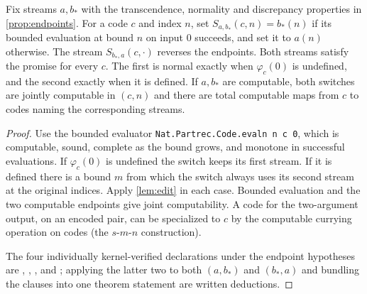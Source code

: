 \documentclass[11pt]{article}
\begin{document}
\begin{theorem}\label{thm:switch}
Fix streams \(a,b_*\) with the transcendence, normality and discrepancy properties in \cref{prop:endpoints}. For a code \(c\) and index \(n\), set \(S_{a,b_*}(c,n)=b_*(n)\) if its bounded evaluation at bound \(n\) on input \(0\) succeeds, and set it to \(a(n)\) otherwise. The stream \(S_{b_*,a}(c,\cdot)\) reverses the endpoints. Both streams satisfy the promise for every \(c\). The first is normal exactly when \(\varphi_c(0)\) is undefined, and the second exactly when it is defined. If \(a,b_*\) are computable, both switches are jointly computable in \((c,n)\) and there are total computable maps from \(c\) to codes naming the corresponding streams.
\end{theorem}
\begin{proof}
Use the bounded evaluator \texttt{Nat.Partrec.Code.evaln n c 0}, which is computable, sound, complete as the bound grows, and monotone in successful evaluations. If \(\varphi_c(0)\) is undefined the switch keeps its first stream. If it is defined there is a bound \(m\) from which the switch always uses its second stream at the original indices. Apply \cref{lem:edit} in each case. Bounded evaluation and the two computable endpoints give joint computability. A code for the two-argument output, on an encoded pair, can be specialized to \(c\) by the computable currying operation on codes (the \(s\)-\(m\)-\(n\) construction).

The four individually kernel-verified declarations under the endpoint hypotheses are ,
,
, and
; applying the latter two to both \((a,b_*)\) and \((b_*,a)\) and bundling the clauses into one theorem statement are written deductions.
\end{proof}
\end{document}
